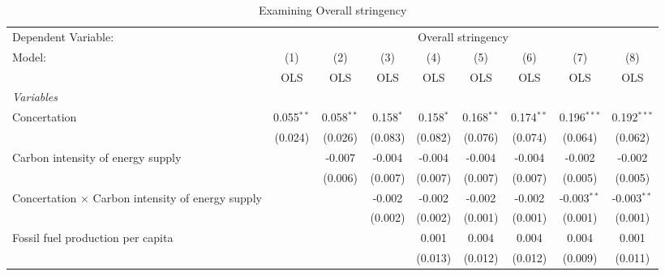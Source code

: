 
\begin{table}[htbp]
   \caption{Examining Overall stringency}
   \centering
   \begin{tabular}{lcccccccc}
      \toprule
      Dependent Variable: & \multicolumn{8}{c}{Overall stringency}\\
      Model:                                                   & (1)          & (2)          & (3)         & (4)         & (5)          & (6)          & (7)           & (8)\\  
                                                               &  OLS         & OLS          & OLS         & OLS         & OLS          & OLS          & OLS           & OLS\\  
      \midrule
      \emph{Variables}\\
      Concertation                                             & 0.055$^{**}$ & 0.058$^{**}$ & 0.158$^{*}$ & 0.158$^{*}$ & 0.168$^{**}$ & 0.174$^{**}$ & 0.196$^{***}$ & 0.192$^{***}$\\   
                                                               & (0.024)      & (0.026)      & (0.083)     & (0.082)     & (0.076)      & (0.074)      & (0.064)       & (0.062)\\   
      Carbon intensity of energy supply                        &              & -0.007       & -0.004      & -0.004      & -0.004       & -0.004       & -0.002        & -0.002\\   
                                                               &              & (0.006)      & (0.007)     & (0.007)     & (0.007)      & (0.007)      & (0.005)       & (0.005)\\   
      Concertation $\times$ Carbon intensity of energy supply  &              &              & -0.002      & -0.002      & -0.002       & -0.002       & -0.003$^{**}$ & -0.003$^{**}$\\   
                                                               &              &              & (0.002)     & (0.002)     & (0.001)      & (0.001)      & (0.001)       & (0.001)\\   
      Fossil fuel production per capita                        &              &              &             & 0.001       & 0.004        & 0.004        & 0.004         & 0.001\\   
                                                               &              &              &             & (0.013)     & (0.012)      & (0.012)      & (0.009)       & (0.011)\\   

\end{tabular}
\end{table}

